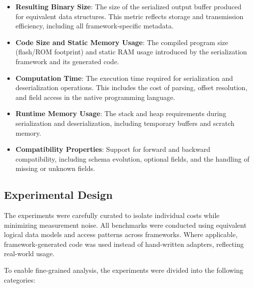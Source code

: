 \documentclass[11pt, a4paper]{article}
\begin{document}
\begin{itemize}
    \item \textbf{Resulting Binary Size}: The size of the serialized output buffer produced for equivalent data structures. This metric reflects storage and transmission efficiency, including all framework-specific metadata.

    \item \textbf{Code Size and Static Memory Usage}: The compiled program size (flash/ROM footprint) and static RAM usage introduced by the serialization framework and its generated code.

    \item \textbf{Computation Time}: The execution time required for serialization and deserialization operations. This includes the cost of parsing, offset resolution, and field access in the native programming language.

    \item \textbf{Runtime Memory Usage}: The stack and heap requirements during serialization and deserialization, including temporary buffers and scratch memory.

    \item \textbf{Compatibility Properties}: Support for forward and backward compatibility, including schema evolution, optional fields, and the handling of missing or unknown fields.
\end{itemize}

\subsection{Experimental Design}

The experiments were carefully curated to isolate individual costs while minimizing measurement noise. All benchmarks were conducted using equivalent logical data models and access patterns across frameworks. Where applicable, framework-generated code was used instead of hand-written adapters, reflecting real-world usage.

To enable fine-grained analysis, the experiments were divided into the following categories:
\end{document}
